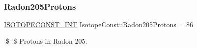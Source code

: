 \subsubsection{\texorpdfstring{Radon205\+Protons}{Radon205Protons}}
{\footnotesize\ttfamily \mbox{\hyperlink{group___isotope_const-_macros_ga5f18360b3e99483a35c32d789e62621c}{I\+S\+O\+T\+O\+P\+E\+C\+O\+N\+S\+T\+\_\+\+I\+NT}} Isotope\+Const\+::\+Radon205\+Protons = 86}

\$ \$ Protons in Radon-\/205. 